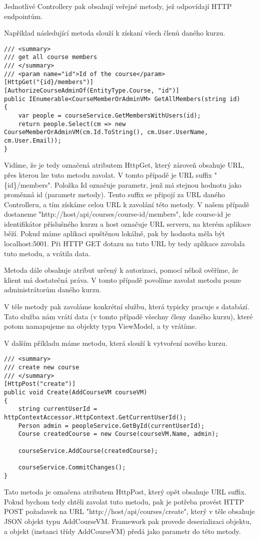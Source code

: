 Jednotlivé Controllery pak obsahují veřejné metody, jež odpovídají HTTP endpointům.

Například následující metoda slouží k získaní všech členů daného kurzu.
\begin{lstlisting}
/// <summary>
/// get all course members
/// </summary>
/// <param name="id">Id of the course</param>
[HttpGet("{id}/members")]
[AuthorizeCourseAdminOf(EntityType.Course, "id")]
public IEnumerable<CourseMemberOrAdminVM> GetAllMembers(string id)
{
	var people = courseService.GetMembersWithUsers(id);
	return people.Select(cm => new CourseMemberOrAdminVM(cm.Id.ToString(), cm.User.UserName, cm.User.Email));
}
\end{lstlisting}

Vidíme, že je tedy označená atributem HttpGet, který zároveň obsahuje URL, přes kterou lze tuto metodu zavolat. V tomto případě je URL suffix "\{id\}/members". Položka Id označuje parametr, jenž má stejnou hodnotu jako proměnná id (parametr metody). Tento suffix se připojí za URL daného Controlleru, a tím získáme celou URL k zavolání této metody. V našem případě dostaneme
\newline
"http://host/api/courses/course-id/members", kde course-id je identifikátor příslušného kurzu a host označuje URL serveru, na kterém aplikace běží. Pokud máme aplikaci spuštěnou lokálně, pak by hodnota měla být localhost:5001. Při HTTP GET dotazu na tuto URL by tedy aplikace zavolala tuto metodu, a vrátila data.

Metoda dále obsahuje atribut určený k autorizaci, pomocí něhož ověříme, že klient má dostatečná práva. V tomto případě povolíme zavolat metodu pouze administrátorům daného kurzu.

V těle metody pak zavoláme konkrétní službu, která typicky pracuje s databází. Tato služba nám vrátí data (v tomto případě všechny členy daného kurzu), které potom namapujeme na objekty typu ViewModel, a ty vrátíme.

\vspace{\baselineskip}

V dalším příkladu máme metodu, která slouží k vytvoření nového kurzu.
\begin{lstlisting}
/// <summary>
/// create new course
/// </summary>
[HttpPost("create")]
public void Create(AddCourseVM courseVM)
{
	string currentUserId = httpContextAccessor.HttpContext.GetCurrentUserId();
	Person admin = peopleService.GetById(currentUserId);
	Course createdCourse = new Course(courseVM.Name, admin);
	
	courseService.AddCourse(createdCourse);
	
	courseService.CommitChanges();
}
\end{lstlisting}
Tato metoda je označena atributem HttpPost, který opět obsahuje URL suffix. Pokud bychom tedy chtěli zavolat tuto metodu, pak je potřeba provést HTTP POST požadavek na URL
\newline
"http://host/api/courses/create", který v těle obsahuje JSON objekt typu AddCourseVM. Framework pak provede deserializaci objektu, a objekt (instanci třídy AddCourseVM) předá jako parametr do této metody.

